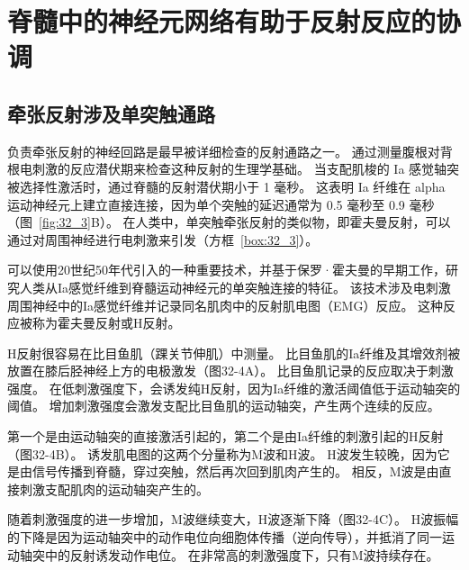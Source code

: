 \section{脊髓中的神经元网络有助于反射反应的协调}

\subsection{牵张反射涉及单突触通路}

负责牵张反射的神经回路是最早被详细检查的反射通路之一。
通过测量腹根对背根电刺激的反应潜伏期来检查这种反射的生理学基础。
当支配肌梭的 Ia 感觉轴突被选择性激活时，通过脊髓的反射潜伏期小于 1 毫秒。
这表明 Ia 纤维在 alpha 运动神经元上建立直接连接，因为单个突触的延迟通常为 0.5 毫秒至 0.9 毫秒（图~\ref{fig:32_3}B）。
在人类中，单突触牵张反射的类似物，即霍夫曼反射，可以通过对周围神经进行电刺激来引发（方框~\ref{box:32_3}）。


\begin{proposition}[霍夫曼反射] \label{box:32_3}
	
	\quad \quad 可以使用20世纪50年代引入的一种重要技术，并基于保罗·霍夫曼的早期工作，研究人类从Ia感觉纤维到脊髓运动神经元的单突触连接的特征。
	该技术涉及电刺激周围神经中的Ia感觉纤维并记录同名肌肉中的反射肌电图（EMG）反应。
	这种反应被称为霍夫曼反射或H反射。
	
	\quad \quad H反射很容易在比目鱼肌（踝关节伸肌）中测量。
	比目鱼肌的Ia纤维及其增效剂被放置在膝后胫神经上方的电极激发（图32-4A）。
	比目鱼肌记录的反应取决于刺激强度。
	在低刺激强度下，会诱发纯H反射，因为Ia纤维的激活阈值低于运动轴突的阈值。
	增加刺激强度会激发支配比目鱼肌的运动轴突，产生两个连续的反应。
	
	\quad \quad 第一个是由运动轴突的直接激活引起的，第二个是由Ia纤维的刺激引起的H反射（图32-4B）。
	诱发肌电图的这两个分量称为M波和H波。
	H波发生较晚，因为它是由信号传播到脊髓，穿过突触，然后再次回到肌肉产生的。
	相反，M波是由直接刺激支配肌肉的运动轴突产生的。
	
	\quad \quad 随着刺激强度的进一步增加，M波继续变大，H波逐渐下降（图32-4C）。
	H波振幅的下降是因为运动轴突中的动作电位向细胞体传播（逆向传导），并抵消了同一运动轴突中的反射诱发动作电位。
	在非常高的刺激强度下，只有M波持续存在。
	
\end{proposition}


